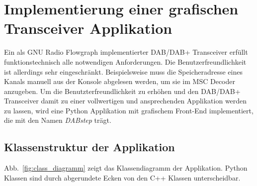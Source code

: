 \chapter{Implementierung einer grafischen Transceiver Applikation}
Ein als GNU Radio Flowgraph implementierter DAB/DAB+ Transceiver erfüllt funktionstechnisch alle notwendigen Anforderungen. Die Benutzerfreundlichkeit ist allerdings sehr eingeschränkt. Beispielsweise muss die Speicheradresse eines Kanals manuell aus der Konsole abgelesen werden, um sie im MSC Decoder anzugeben. Um die Benutzterfreundlichkeit zu erhöhen und den DAB/DAB+ Transceiver damit zu einer vollwertigen und ansprechenden Applikation werden zu lassen, wird eine Python Applikation mit grafischem Front-End implementiert, die mit den Namen \glqq \textit{DABstep}\grqq{} trägt.
\section{Klassenstruktur der Applikation}
Abb.~\ref{fig:class_diagramm} zeigt das Klassendiagramm der Applikation. Python Klassen sind durch abgerundete Ecken von den C++ Klassen unterscheidbar.

